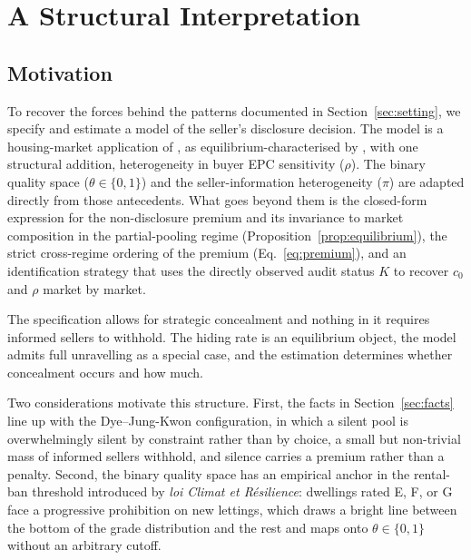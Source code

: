 
\section{A Structural Interpretation}
\label{sec:model}

\subsection{Motivation}
\label{ss:model_motivation}

To recover the forces behind the patterns documented in
Section~\ref{sec:setting}, we specify and estimate a model of the seller's disclosure
decision. The model is a housing-market application of \citet{dye_disclosure_1985}, as
equilibrium-characterised by \citet{jung_kwon_1988}, with one structural addition,
heterogeneity in buyer EPC sensitivity ($\rho$). The binary quality space
($\theta\in\{0,1\}$) and the seller-information heterogeneity ($\pi$) are adapted directly
from those antecedents. What goes beyond them is the closed-form expression for the
non-disclosure premium and its invariance to market composition in the partial-pooling
regime (Proposition~\ref{prop:equilibrium}), the strict cross-regime ordering of the premium
(Eq.~\ref{eq:premium}), and an identification strategy that uses the directly observed audit
status $K$ to recover $c_0$ and $\rho$ market by market.

The specification allows for strategic concealment and nothing in it requires informed sellers to
withhold. The hiding rate is an equilibrium object, the model admits full unravelling as a special
case, and the estimation determines whether concealment occurs and how much.

Two considerations motivate this structure. First, the facts in
Section~\ref{sec:facts} line up with the Dye--Jung-Kwon configuration, in which a silent pool is
overwhelmingly silent by constraint rather than by choice, a small but non-trivial mass of
informed sellers withhold, and silence carries a premium rather than a penalty. Second, the binary quality space has an empirical anchor in the rental-ban
threshold introduced by \emph{loi Climat et R\'esilience}: dwellings rated E, F, or G face a
progressive prohibition on new lettings, which draws a bright line between the bottom of the
grade distribution and the rest and maps onto $\theta\in\{0,1\}$ without an arbitrary cutoff.

